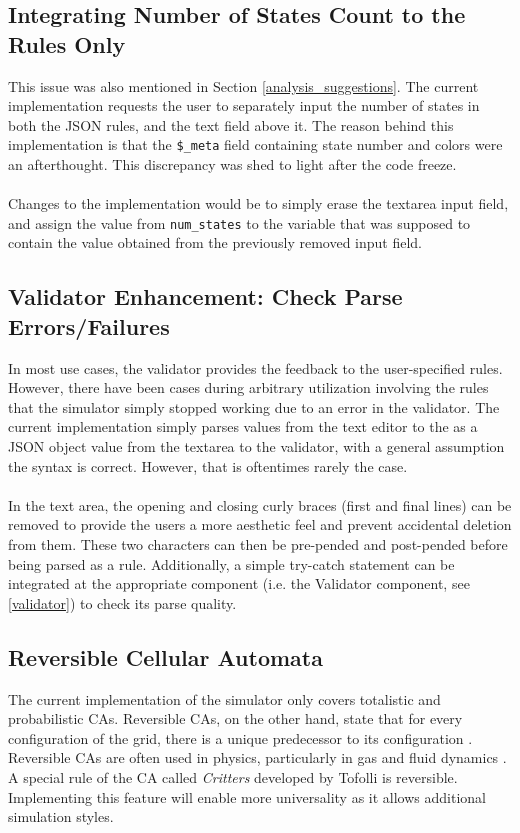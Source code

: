 \subsection{Integrating Number of States Count to the Rules Only}
This issue was also mentioned in Section \ref{analysis_suggestions}. The current implementation requests the user to separately input the number of states in both the JSON rules, and the text field above it. The reason behind this implementation is that the \texttt{\$\_meta} field containing state number and colors were an afterthought. This discrepancy was shed to light after the code freeze.  
\\ \\
Changes to the implementation would be to simply erase the textarea input field, and assign the value from \texttt{num\_states} to the variable that was supposed to contain the value obtained from the previously removed input field.

\subsection{Validator Enhancement: Check Parse Errors/Failures}
In most use cases, the validator provides the feedback to the user-specified rules. However, there have been cases during arbitrary utilization involving the rules that the simulator simply stopped working due to an error in the validator. The current implementation simply parses values from the text editor to the as a JSON object value from the textarea to the validator, with a general assumption the syntax is correct. However, that is oftentimes rarely the case.
\\ \\
In the text area, the opening and closing curly braces (first and final lines) can be removed to provide the users a more aesthetic feel and prevent accidental deletion from them. These two characters can then be pre-pended and post-pended before being parsed as a rule. Additionally, a simple try-catch statement can be integrated at the appropriate component (i.e. the Validator component, see \ref{validator}) to check its parse quality. 

\subsection{Reversible Cellular Automata}
The current implementation of the simulator only covers totalistic and probabilistic CAs. Reversible CAs, on the other hand, state that for every configuration of the grid, there is a unique predecessor to its configuration \cite{gutowitz1991cellular}. Reversible CAs are often used in physics, particularly in gas and fluid dynamics \cite{toffoli1987cellular}. A special rule of the CA called \textit{Critters} developed by Tofolli \cite{toffoli1987cellular} is reversible. Implementing this feature will enable more universality as it allows additional simulation styles. 

